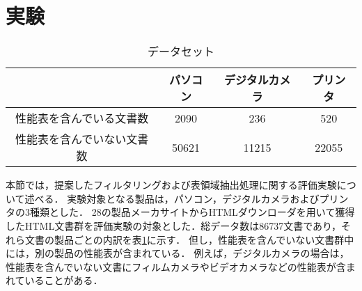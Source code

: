 \section{実験}
\begin{table}
\caption{データセット}
\label{dataset}
\begin{center}
\begin{tabular}{|c|c|c|c|}\hline
& パソコン & デジタルカメラ & プリンタ \\ \hline \hline
性能表を含んでいる文書数& 2090 & 236 & 520 \\ \hline
性能表を含んでいない文書数& 50621 & 11215 & 22055\\ \hline
\end{tabular}
\end{center}
\end{table}
本節では，提案したフィルタリングおよび表領域抽出処理に関する評価実験について述べる．
実験対象となる製品は，パソコン，デジタルカメラおよびプリンタの3種類とした．
28の製品メーカサイトからHTMLダウンローダを用いて獲得したHTML文書群を評価実験の対象とした．総データ数は86737文書であり，それら文書の製品ごとの内訳を表\ref{dataset}に示す．
但し，性能表を含んでいない文書群中には，別の製品の性能表が含まれている．
例えば，デジタルカメラの場合は，性能表を含んでいない文書にフィルムカメラやビデオカメラなどの性能表が含まれていることがある．


